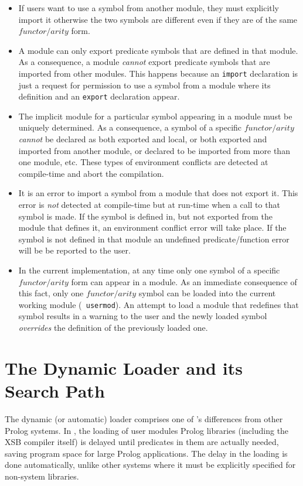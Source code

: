 \begin{itemize}
\item   If users want to use a symbol from another module, they must
        explicitly import it otherwise the two symbols are different
        even if they are of the same $functor/arity$ form.
\item	A module can only export predicate symbols that are defined in
        that module.  As a consequence, a module {\em cannot} export
        predicate symbols that are imported from other modules.
        This happens because an {\tt import} declaration is just a
        request for permission to use a symbol from a module where
        its definition and an {\tt export} declaration appear.
\item   The implicit module for a particular symbol appearing in a
        module must be uniquely determined.  As a consequence, a
        symbol of a specific $functor/arity$ {\em cannot} be declared
        as both exported and local, or both exported and imported from
        another module, or declared to be imported from more than one
        module, etc.  These types of environment conflicts are
        detected at compile-time and abort the compilation.
\item   It is an error to import a symbol from a module that does not
        export it.  This error is {\em not\/} detected at compile-time
        but at run-time when a call to that symbol is made.  If the
        symbol is defined in, but not exported from the module that
	defines it, an environment conflict error will take place.
	If the symbol is not defined in that module an undefined
	predicate/function error will be be reported to the user.
\item   In the current implementation, at any time only one symbol of
        a specific $functor/arity$ form can appear in a module.  As an
        immediate consequence of this fact, only one $functor/arity$
        symbol can be loaded into the current working module ({\tt
        usermod}).  An attempt to load a module that redefines that
        symbol results in a warning to the user and the newly loaded
        symbol {\em overrides} the definition of the previously loaded
        one.
\end{itemize}

\section{The Dynamic Loader and its Search Path} \label{LibPath}
The dynamic (or automatic) loader comprises one of \ourprolog's 
differences from other Prolog systems.
In \ourprolog, the loading of user modules Prolog libraries (including
the XSB compiler itself) is delayed until predicates in them
are actually needed, saving program space for large Prolog
applications.  The delay in the loading is done automatically, unlike
other systems where it must be explicitly specified for non-system
libraries.

